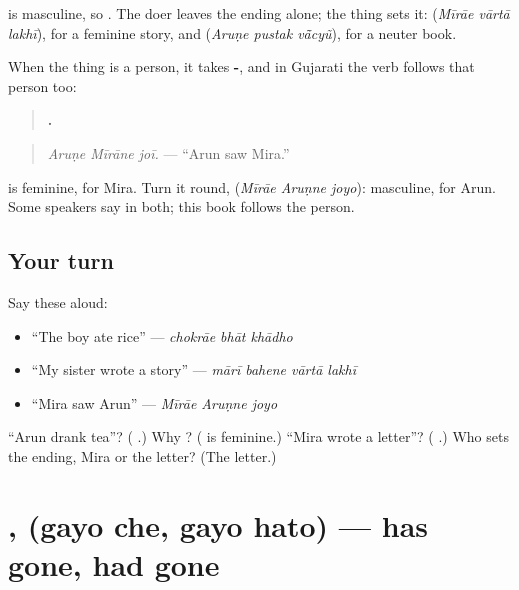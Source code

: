 \textbf{} is masculine, so \textbf{}. The doer leaves the ending alone; the thing sets it: \textbf{  } (\emph{Mīrāe vārtā lakhī}), for a feminine story, and \textbf{  } (\emph{Aruṇe pustak vā̃cyũ}), for a neuter book.

When the thing is a person, it takes \textbf{-}, and in Gujarati the verb follows that person too:

\begin{quote}
\textbf{  .}
\end{quote}

\begin{quote}
\emph{Aruṇe Mīrāne joī.} — \textquotedblleft{}Arun saw Mira.\textquotedblright{}
\end{quote}

\textbf{} is feminine, for Mira. Turn it round, \textbf{  } (\emph{Mīrāe Aruṇne joyo}): masculine, for Arun. Some speakers say \textbf{} in both; this book follows the person.

\subsection*{Your turn}
Say these aloud:

\begin{itemize}
\raggedright
  \item \textquotedblleft{}The boy ate rice\textquotedblright{} — \emph{chokrāe bhāt khādho}
  \item \textquotedblleft{}My sister wrote a story\textquotedblright{} — \emph{mārī bahene vārtā lakhī}
  \item \textquotedblleft{}Mira saw Arun\textquotedblright{} — \emph{Mīrāe Aruṇne joyo}
\end{itemize}

\begin{tcolorbox}[breakable,colback=teal!4,colframe=teal!35!black,title={Before you move on}]
\textquotedblleft{}Arun drank tea\textquotedblright{}? (\textbf{  }.) Why \textbf{}? (\textbf{} is feminine.) \textquotedblleft{}Mira wrote a letter\textquotedblright{}? (\textbf{  }.) Who sets the ending, Mira or the letter? (The letter.)
\end{tcolorbox}
\section[\texorpdfstring{\gu{ગયો} \gu{છે} · \gu{ગયો} \gu{હતો} (gayo che · gayo hato)}{ગયો છે · ગયો હતો (gayo che · gayo hato)}]{ ,   (gayo che, gayo hato) — has gone, had gone}

